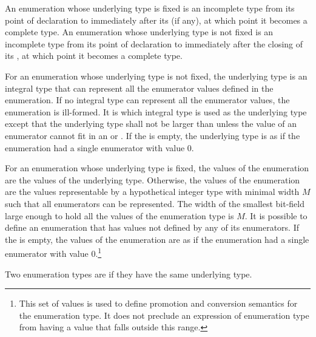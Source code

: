 \pnum
An enumeration whose underlying type is fixed is an incomplete type from its
point of declaration to immediately after its
 (if any), at which point it becomes a complete type.
An enumeration whose underlying type is not fixed is an incomplete type from
its point of declaration to immediately after the closing \tcode{\}} of its
, at which point it becomes a complete type.

\pnum
For an enumeration whose underlying type is not fixed,
the underlying type
is an
integral type that can represent all the enumerator values defined in
the enumeration. If no integral type can represent all the enumerator
values, the enumeration is ill-formed. It is 
which integral type is used as the underlying type
except that the underlying type shall not be larger than 
unless the value of an enumerator cannot fit in an  or
. If the  is empty, the
underlying type is as if the enumeration had a single enumerator with
value 0.

\pnum
{}%
For an enumeration whose underlying type is fixed, the values of
the enumeration are the values of the underlying type. Otherwise,
the values of the enumeration are the values representable by
a hypothetical integer type with minimal width $M$
such that all enumerators can be represented.
The width of the smallest bit-field large enough to hold all the values of the
enumeration type is $M$.
It is possible to define an enumeration that has values not defined by
any of its enumerators. If the  is empty, the
values of the enumeration are as if the enumeration had a single enumerator with
value 0.\footnote{This set of values is used to define promotion and
conversion semantics for the enumeration type. It does not preclude an
expression of enumeration type from having a value that falls outside
this range.}

\pnum
Two enumeration types are 
if they have the same underlying type.

